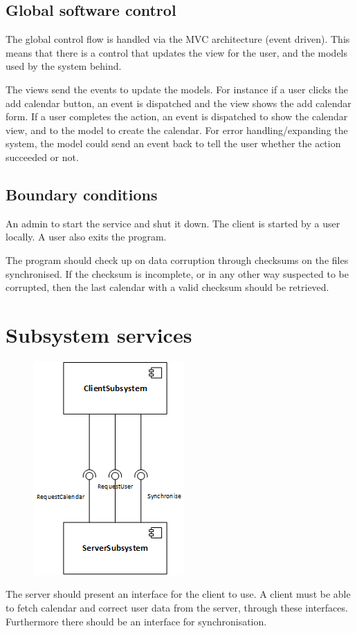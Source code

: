 \documentclass[10pt]{report}
\numberwithin{equation}{section} %
\numberwithin{figure}{section} %
\numberwithin{table}{section} %
\begin{document}
\subsection{Global software control}
The global control flow is handled via the MVC architecture (event driven). This
means that there is a control that updates the view for the user, and the models
used by the system behind.

The views send the events to update the models. For instance if a user
clicks the add calendar button, an event is dispatched and the view shows the
add calendar form. If a user completes the action, an event is dispatched to
show the calendar view, and to the model to create the calendar. For error
handling/expanding the system, the model could send an event back to tell the
user whether the action succeeded or not.

\subsection{Boundary conditions}
An admin to start the service and shut it down.
The client is started by a user locally.
A user also exits the program.

The program should check up on data corruption through checksums on the files
synchronised. If the checksum is incomplete, or in any other way suspected to be
corrupted, then the last calendar with a valid checksum should be retrieved.

\section{Subsystem services}
\begin{center}
  \begin{figure}[H]
    \includegraphics[scale=1.0]{subsystemservices.png}
  \end{figure}
\end{center}

The server should present an interface for the client to use.  A client must be
able to fetch calendar and correct user data from the server, through these
interfaces. Furthermore there should be an interface for synchronisation.

\end{document}
